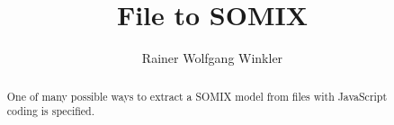 \documentclass[preprint,12pt]{elsarticle}
\begin{document}
\begin{frontmatter}



\title{File to SOMIX}


\author[1]{Rainer Wolfgang Winkler%
}
\address[1]{CubeServ GmbH, Am Prime-Parc 4, 65479 Raunheim, Germany}



\begin{abstract}
One of many possible ways to extract a SOMIX model from files with JavaScript coding is specified.

\end{abstract}


\begin{keyword}




\end{keyword}

\end{frontmatter}
\end{document}
